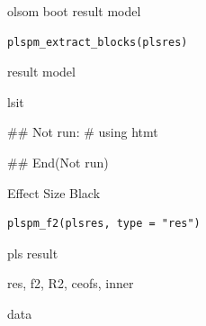 \documentclass[a4paper]{book}
\begin{document}
%
\begin{Description}
olsom boot result model
\end{Description}
%
\begin{Usage}
\begin{verbatim}
plspm_extract_blocks(plsres)
\end{verbatim}
\end{Usage}
%
\begin{Arguments}
\begin{ldescription}
\item[\code{plsres}] result model
\end{ldescription}
\end{Arguments}
%
\begin{Value}
lsit
\end{Value}
%
\begin{Examples}
\begin{ExampleCode}

## Not run: 
# using htmt

## End(Not run)


\end{ExampleCode}
\end{Examples}
%
\begin{Description}
Effect Size Black
\end{Description}
%
\begin{Usage}
\begin{verbatim}
plspm_f2(plsres, type = "res")
\end{verbatim}
\end{Usage}
%
\begin{Arguments}
\begin{ldescription}
\item[\code{plsres}] pls result

\item[\code{type}] res, f2, R2, ceofs, inner
\end{ldescription}
\end{Arguments}
%
\begin{Value}
data
\end{Value}
%
\end{document}
